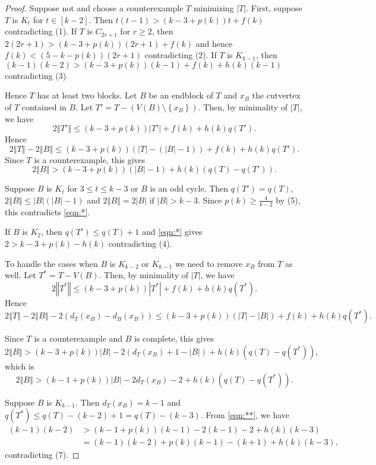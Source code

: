 \documentclass[12pt]{article}
\theoremstyle{plain}
\theoremstyle{definition}
\theoremstyle{remark}
\newcommand{\set}[1]{\left\{ #1 \right\}}
\newcommand{\card}[1]{\left|#1\right|}
\newcommand{\size}[1]{\left\Vert#1\right\Vert}
\newcommand{\irange}[1]{\left[#1\right]}
\newcommand{\parens}[1]{\left( #1 \right)}
\begin{document}
\begin{proof}
	Suppose not and choose a counterexample $T$ minimizing $|T|$.  First, suppose $T$ is $K_t$ for $t \in \irange{k-2}$.  Then $t(t-1) > (k-3 + p(k))t + f(k)$ contradicting (1).  If $T$ is $C_{2r+1}$ for $r \ge 2$, then $2(2r+1) > (k-3 + p(k))(2r+1) + f(k)$ and hence $f(k) < (5-k-p(k))(2r+1)$ contradicting (2).  If $T$ is $K_{k-1}$, then $(k-1)(k-2) > (k-3 + p(k))(k-1) + f(k) + h(k)(k-1)$ contradicting (3).
	
	Hence $T$ has at least two blocks.  Let $B$ be an endblock of $T$ and $x_B$ the cutvertex of $T$ contained in $B$. Let $T' = T - \parens{V(B) \setminus \set{x_B}}$. Then, by minimality of $|T|$, we have
	\[2\size{T'} \le (k-3 + p(k))\card{T'} + f(k) + h(k)q(T').\]
	Hence
		\[2\size{T} - 2\size{B} \le (k-3 + p(k))\parens{\card{T} - (\card{B} - 1)} + f(k) + h(k)q(T').\]
    Since $T$ is a counterexample, this gives
    \begin{equation}
	    2\size{B} > (k-3 + p(k))(\card{B} - 1) + h(k)\parens{q(T) - q(T')}.\tag{*}\label{eqn:*}
    \end{equation}
    
    Suppose $B$ is $K_t$ for $3 \le t \le k-3$ or $B$ is an odd cycle. Then $q(T') = q(T)$, $2\size{B} \le \card{B}(\card{B}-1)$ and $2\size{B} = 2\card{B}$ if $\card{B} > k-3$.  Since $p(k) \ge \frac{4}{k-2}$ by (5), this contradicts \ref{eqn:*}.
    
    If $B$ is $K_2$, then $q(T') \le q(T) + 1$ and \ref{eqn:*} gives $2 > k-3 + p(k) - h(k)$ contradicting (4).
    
	To handle the cases when $B$ is $K_{k-2}$ or $K_{k-1}$ we need to remove $x_B$ from $T$ as well.  Let $T^* = T - V(B)$. Then, by minimality of $|T|$, we have
	\[2\size{T^*} \le (k-3 + p(k))\card{T^*} + f(k) + h(k)q(T^*).\]
	Hence
		\[2\size{T} - 2\size{B} - 2(d_T(x_B) - d_B(x_B)) \le (k-3 + p(k))\parens{\card{T} - \card{B}} + f(k) + h(k)q(T^*).\]
		
	Since $T$ is a counterexample and $B$ is complete, this gives
	\[2\size{B} > (k-3 + p(k))\card{B} -2(d_T(x_B) + 1 - \card{B}) + h(k)\parens{q(T) - q(T^*)},\]
	which is
		 \begin{equation}
		 2\size{B} > (k-1 + p(k))\card{B} - 2d_T(x_B) - 2 + h(k)\parens{q(T) - q(T^*)}.\tag{**}\label{eqn:**}
		 \end{equation}
		 
		 	Suppose $B$ is $K_{k-1}$.  Then $d_T(x_B) = k - 1$ and $q(T^*) \le q(T) - (k-2) + 1 = q(T) - (k-3)$.  From \ref{eqn:**}, we have
		 	\begin{align*}
		 		(k-1)(k-2) &> (k-1 + p(k))(k-1) - 2(k-1) - 2 + h(k)(k-3)\\
		 		&= (k-1)(k-2) + p(k)(k-1) - (k+1) + h(k)(k-3),
		 	\end{align*}
		 	contradicting (7).
		 	

\end{proof}
\end{document}
